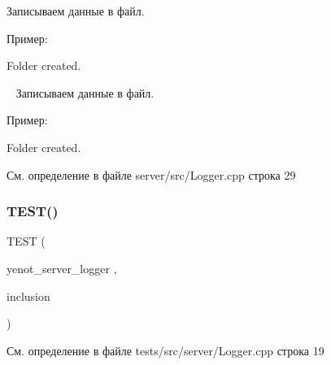 Записываем данные в файл.

Пример\+: 
\begin{DoxyCode}
[2018/05/02 17:17:03] [WARN]Folder created.
\end{DoxyCode}
 ~\newline
 Записываем данные в файл.

Пример\+: 
\begin{DoxyCode}
[WARN]Folder created.
\end{DoxyCode}
 

См. определение в файле server/src/\+Logger.\+cpp строка 29

\mbox{\label{group__loggercpp_ga10abf17037baa88fa1698c6759b8c4ad}} 
\subsubsection{\texorpdfstring{T\+E\+S\+T()}{TEST()}}
{\footnotesize\ttfamily T\+E\+ST (\begin{DoxyParamCaption}\item[{yenot\+\_\+server\+\_\+logger}]{,  }\item[{inclusion}]{ }\end{DoxyParamCaption})}



См. определение в файле tests/src/server/\+Logger.\+cpp строка 19

